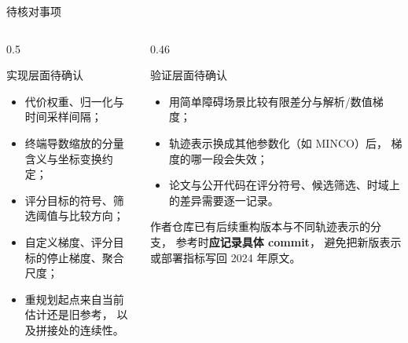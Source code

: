 \begin{frame}{待核对事项}
  \small
  \begin{columns}[t]
    \begin{column}{0.5\textwidth}
      \begin{block}{实现层面待确认}
        \footnotesize
        \begin{itemize}\tight
          \item 代价权重、归一化与时间采样间隔；
          \item 终端导数缩放的分量含义与坐标变换约定；
          \item 评分目标的符号、筛选阈值与比较方向；
          \item 自定义梯度、评分目标的停止梯度、聚合尺度；
          \item 重规划起点来自当前估计还是旧参考，
                以及拼接处的连续性。
        \end{itemize}
      \end{block}
    \end{column}
    \begin{column}{0.46\textwidth}
      \begin{block}{验证层面待确认}
        \footnotesize
        \begin{itemize}\tight
          \item 用简单障碍场景比较有限差分与解析/数值梯度；
          \item 轨迹表示换成其他参数化（如 MINCO）后，
                梯度的哪一段会失效；
          \item 论文与公开代码在评分符号、候选筛选、时域上的差异需要逐一记录。
        \end{itemize}
      \end{block}
      \begin{reading}
        \scriptsize
        作者仓库已有后续重构版本与不同轨迹表示的分支，
        参考时\textbf{应记录具体 commit}，
        避免把新版表示或部署指标写回 2024 年原文。
      \end{reading}
    \end{column}
  \end{columns}
\end{frame}

